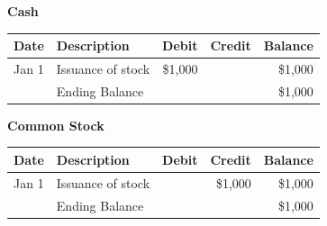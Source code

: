 \small
\begin{tcolorbox}[colframe=black,colback=white,title=Example General Ledger]
    \textbf{Cash} \\
    \begin{tabular}{llrrr}
        Date  & Description       & Debit   & Credit & Balance \\
        \hline
        Jan 1 & Issuance of stock & \$1,000 &        & \$1,000 \\
        \hline
              & Ending Balance    &         &        & \$1,000 \\
    \end{tabular}

    \vspace{0.5em}
    \textbf{Common Stock}\\
    \begin{tabular}{llrrr}
        Date  & Description       & Debit & Credit  & Balance \\
        \hline
        Jan 1 & Issuance of stock &       & \$1,000 & \$1,000 \\
        \hline
              & Ending Balance    &       &         & \$1,000 \\
    \end{tabular}
\end{tcolorbox}
\normalsize

